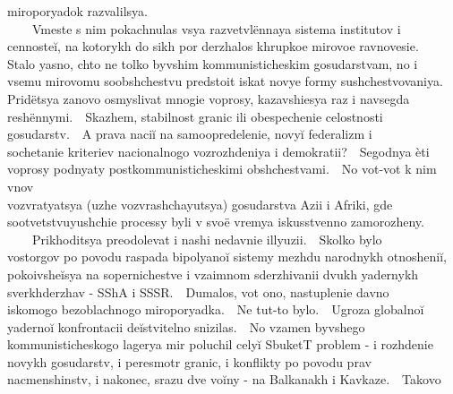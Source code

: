 {miroporyadok razvalilsya.\\
{\ \ }{\ \ }Vmeste s nim pokachnulas{\cprime} vsya razvetvl\"ennaya sistema institutov i\\
cennoste{\u i}, na kotorykh do sikh por derzhalos{\cprime} khrupkoe mirovoe ravnovesie.\\
Stalo yasno, chto ne tol{\cprime}ko byvshim kommunisticheskim gosudarstvam, no i\\
vsemu mirovomu soobshchestvu predstoit iskat{\cprime} novye formy sushchestvovaniya.\\
Prid\"et{\cydot}sya zanovo osmyslivat{\cprime} mnogie voprosy, kazavshiesya raz i navsegda\\
resh\"ennymi.{\ \ }Skazhem, stabil{\cprime}nost{\cprime} granic ili obespechenie celostnosti\\
gosudarstv.{\ \ }A prava naci{\u i} na samoopredelenie, novy{\u i} federalizm i\\
sochetanie kriteriev nacional{\cprime}nogo vozrozhdeniya i demokratii?{\ \ }Segodnya \`eti\\
voprosy podnyaty postkommunisticheskimi obshchestvami.{\ \ }No vot-vot k nim vnov{\cprime}\\
vozvratyat{\cydot}sya (uzhe vozvrashchayut{\cydot}sya) gosudarstva Azii i Afriki, gde\\
sootvet{\cydot}stvuyushchie processy byli v svo\"e vremya iskusstvenno zamorozheny.\\
{\ \ }{\ \ }Prikhodit{\cydot}sya preodolevat{\cprime} i nashi nedavnie illyuzii.{\ \ }Skol{\cprime}ko bylo\\
vostorgov po povodu raspada bipolyano{\u i} sistemy mezhdu narodnykh otnosheni{\u i},\\
pokoivshe{\u i}sya na sopernichestve i vzaimnom sderzhivanii dvukh yadernykh\\
sverkhderzhav - SShA i SSSR.{\ \ }Dumalos{\cprime}, vot ono, nastuplenie davno\\
iskomogo bezoblachnogo miroporyadka.{\ \ }Ne tut-to bylo.{\ \ }Ugroza global{\cprime}no{\u i}\\
yaderno{\u i} konfrontacii de{\u i}stvitel{\cprime}no snizilas{\cprime}.{\ \ }No vzamen byvshego\\
kommunisticheskogo lagerya mir poluchil cely{\u i} SbuketT problem - i rozhdenie\\
novykh gosudarstv, i peresmotr granic, i konflikty po povodu prav\\
nacmen{\cprime}shinstv, i nakonec, srazu dve vo{\u i}ny - na Balkanakh i Kavkaze.{\ \ }Takovo\\
}
